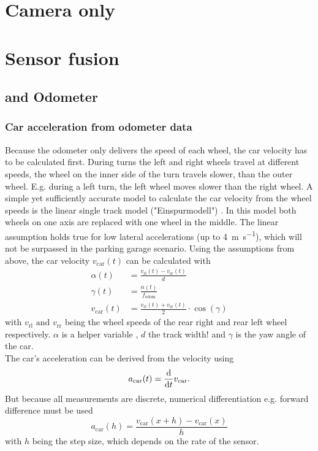\section{Camera only}



\section{Sensor fusion}


\subsection{ and Odometer}

\subsubsection{Car acceleration from odometer data}
Because the odometer only delivers the speed of each wheel, the car velocity has to be calculated first.
During turns the left and right wheels travel at different speeds, the wheel on the inner side of the turn travels slower, than the outer wheel.
E.g. during a left turn, the left wheel moves slower than the right wheel.
A simple yet sufficiently accurate model to calculate the car velocity from the wheel speeds is the linear single track model ("Einspurmodell") \cite{Mitschke2014}.
In this model both wheels on one axis are replaced with one wheel in the middle.
The linear assumption holds true for low lateral accelerations (up to \SI{4}{\metre\per\second}), which will not be surpassed in the parking garage scenario.
Using the assumptions from above, the car velocity $v_\mathrm{car}(t)$ can be calculated with
\begin{align}
    \alpha(t) &= \frac{v_\mathrm{rl}(t) - v_\mathrm{rr}(t)}{d} \\
    \gamma(t) &= \frac{\alpha(t)}{f_\mathrm{odom}} \\
    v_\mathrm{car}(t) &= \frac{v_\mathrm{rl}(t) + v_\mathrm{rr}(t)}{2}\cdot\cos(\gamma)
\end{align}
with $v_\mathrm{rl} \text{ and } v_\mathrm{rr}$ being the wheel speeds of the rear right and rear left wheel respectively.
$\alpha$ is a helper variable , $d$ the track width! and $\gamma$ is the yaw angle of the car.\\
The car's acceleration can be derived from the velocity using
\begin{equation}
    a_\mathrm{car}(t) = \dv{t}v_\mathrm{car}.
\end{equation}
But because all measurements are discrete, numerical differentiation e.g. forward difference must be used
\begin{equation}
    a_\mathrm{car}(h) = \frac{v_\mathrm{car}(x + h) - v_\mathrm{car}(x)}{h}
\end{equation}
with $h$ being the step size, which depends on the rate of the sensor.

